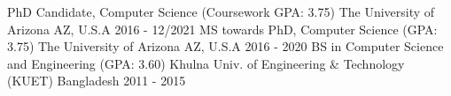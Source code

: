 

\begin{cventries}

  \cventry
    {PhD Candidate, Computer Science (Coursework GPA: 3.75)} %
    {The University of Arizona} %
    {AZ, U.S.A} %
    {2016 - 12/2021} %
    {}
    {}
  \vspace*{-2mm}
  \cventry
    {MS towards PhD, Computer Science (GPA: 3.75)} %
    {The University of Arizona} %
    {AZ, U.S.A} %
    {2016 - 2020} %
    {}
    {}
  \vspace*{-2mm}
  \cventry
    {BS in Computer Science and Engineering (GPA: 3.60)} %
    {Khulna Univ. of Engineering \& Technology (KUET)} %
    {Bangladesh} %
    {2011 - 2015} %
    {}
    {}

\end{cventries}
